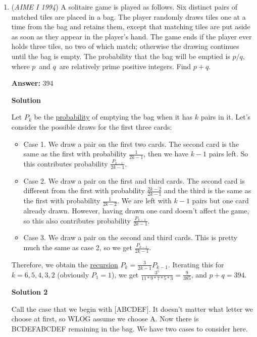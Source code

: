 \begin{enumerate}
	\item (\textit{AIME I 1994}) A solitaire game is played as follows.  Six distinct pairs of matched tiles are placed in a bag.  The player randomly draws tiles one at a time from the bag and retains them, except that matching tiles are put aside as soon as they appear in the player's hand.  The game ends if the player ever holds three tiles, no two of which match; otherwise the drawing continues until the bag is empty.  The probability that the bag will be emptied is $p/q,\,$ where $p\,$ and $q\,$ are relatively prime positive integers.  Find $p+q.\,$

 \textbf{Answer: }394



\textbf{Solution}

Let $P_k$ be the \href{https://artofproblemsolving.com/wiki/index.php?title=Probability}{probability} of emptying the bag when it has $k$ pairs in it. Let's consider the possible draws for the first three cards:

 
            \begin{itemize}
        \item Case 1. We draw a pair on the first two cards. The second card is the same as the first with probability $\frac {1}{2k - 1}$, then we have $k - 1$ pairs left. So this contributes probability $\frac {P_{k - 1}}{2k - 1}$.
        \item Case 2. We draw a pair on the first and third cards. The second card is different from the first with probability $\frac {2k - 2}{2k - 1}$ and the third is the same as the first with probability $\frac {1}{2k - 2}$. We are left with $k - 1$ pairs but one card already drawn. However, having drawn one card doesn't affect the game, so this also contributes probability $\frac {P_{k - 1}}{2k - 1}$.
        \item Case 3. We draw a pair on the second and third cards. This is pretty much the same as case 2, so we get $\frac {P_{k - 1}}{2k - 1}$.
            \end{itemize}
            Therefore, we obtain the \href{https://artofproblemsolving.com/wiki/index.php?title=Recursion}{recursion} $P_k = \frac {3}{2k - 1}P_{k - 1}$. Iterating this for $k = 6,5,4,3,2$ (obviously $P_1 = 1$), we get $\frac {3^5}{11*9*7*5*3} = \frac {9}{385}$, and $p+q=\boxed{394}$.

 



\textbf{Solution 2}

Call the case that we begin with [ABCDEF]. It doesn't matter what letter we choose at first, so WLOG assume we choose A. Now there is BCDEFABCDEF remaining in the bag. We have two cases to consider here.


\end{enumerate}
